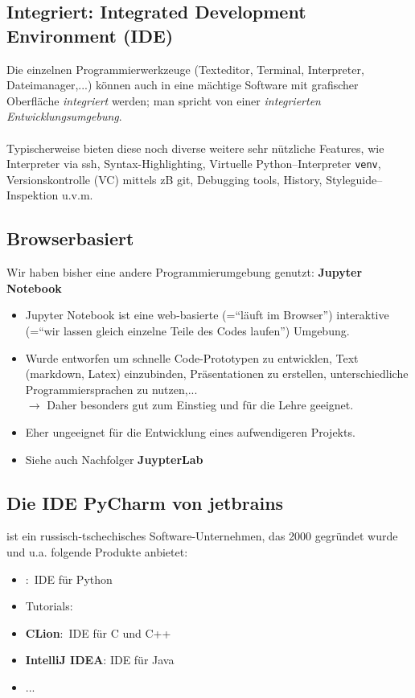 \subsection{Integriert: Integrated Development Environment (IDE)}
Die einzelnen Programmierwerkzeuge (Texteditor, Terminal, Interpreter, Dateimanager,...) können auch in eine mächtige Software mit grafischer Oberfläche \textit{integriert} werden; man spricht von einer \textit{integrierten Entwicklungsumgebung}.\\~\\ 
Typischerweise bieten diese noch diverse weitere sehr nützliche Features, wie Interpreter via ssh, Syntax-Highlighting, Virtuelle Python--Interpreter \texttt{venv}, Versionskontrolle (VC) mittels zB git, Debugging tools, History, Styleguide--Inspektion u.v.m.\\




\subsection{Browserbasiert}
Wir haben bisher eine andere Programmierumgebung genutzt: \textbf{Jupyter Notebook}
\begin{itemize}
	\item Jupyter Notebook ist eine web-basierte (=``läuft im Browser'') interaktive (=``wir lassen gleich einzelne Teile des Codes laufen'') Umgebung.
	\item Wurde entworfen um schnelle Code-Prototypen zu entwicklen, Text (markdown, Latex) einzubinden, Präsentationen zu erstellen, unterschiedliche Programmiersprachen zu nutzen,...\\
	$\to$ Daher besonders gut zum Einstieg und für die Lehre geeignet.
	\item Eher ungeeignet für die Entwicklung eines aufwendigeren Projekts.
	\item Siehe auch Nachfolger \textbf{JuypterLab}
\end{itemize}


\subsection{Die IDE PyCharm von jetbrains}
 ist ein russisch-tschechisches Software-Unternehmen, das 2000 gegründet wurde und u.a. folgende Produkte anbietet:
\begin{itemize}
	\item \textbf{\pycharm}:~IDE für Python
	\item Tutorials: 
	\item \textbf{CLion}:~IDE für C und C++
	\item \textbf{IntelliJ IDEA}: IDE für Java
	\item ...
\end{itemize}


